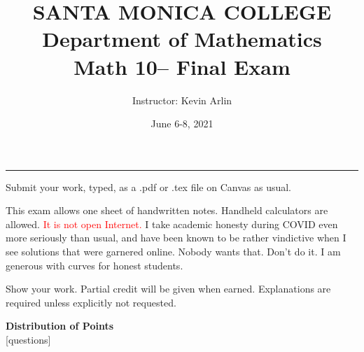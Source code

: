 \documentclass[letterpaper,12pt,addpoints,answers]{exam}
\newcommand{\university}{SANTA MONICA COLLEGE}
\newcommand{\faculty}{Department of Mathematics}
\newcommand{\class}{Math 10}
\newcommand{\examnum}{Final Exam}
\newcommand{\examdate}{June 6-8, 2021}
\begin{document}
\title{\Large \textbf{\university\\ \faculty\\
        \bigskip
        \class -- \examnum }}
\author{Instructor: Kevin Arlin}
\date{\examdate}
\maketitle
\noindent \rule{\textwidth}{1pt}

Submit your work, typed, as a .pdf or .tex file on Canvas as usual.

This exam allows one sheet of handwritten notes. Handheld calculators are allowed.
\textcolor{red}{It is not open Internet.}  I take
academic honesty during COVID even more seriously than usual, and have been known to
be rather vindictive when I see solutions that were garnered online. Nobody wants that.
Don't do it. I am generous with curves for honest students.

Show your work. Partial credit will be given when earned. Explanations are
required unless explicitly not requested.


\begin{center}
    \textbf{Distribution of Points}\\
    \medskip
    [questions]
\end{center}

\clearpage
\end{document}
